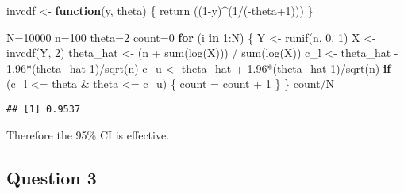 \documentclass[
]{article}
\newenvironment{Shaded}{\begin{snugshade}}{\end{snugshade}}
\newcommand{\ControlFlowTok}[1]{\textcolor[rgb]{0.13,0.29,0.53}{\textbf{#1}}}
\newcommand{\DecValTok}[1]{\textcolor[rgb]{0.00,0.00,0.81}{#1}}
\newcommand{\FloatTok}[1]{\textcolor[rgb]{0.00,0.00,0.81}{#1}}
\newcommand{\FunctionTok}[1]{\textcolor[rgb]{0.00,0.00,0.00}{#1}}
\newcommand{\NormalTok}[1]{#1}
\newcommand{\OtherTok}[1]{\textcolor[rgb]{0.56,0.35,0.01}{#1}}
\newcommand{\SpecialCharTok}[1]{\textcolor[rgb]{0.00,0.00,0.00}{#1}}
\begin{document}
\begin{Shaded}
\begin{Highlighting}[]
\NormalTok{invcdf }\OtherTok{\textless{}{-}} \ControlFlowTok{function}\NormalTok{(y, theta) \{}
  \FunctionTok{return}\NormalTok{ ((}\DecValTok{1}\SpecialCharTok{{-}}\NormalTok{y)}\SpecialCharTok{\^{}}\NormalTok{(}\DecValTok{1}\SpecialCharTok{/}\NormalTok{(}\SpecialCharTok{{-}}\NormalTok{theta}\SpecialCharTok{+}\DecValTok{1}\NormalTok{)))}
\NormalTok{\}}

\NormalTok{N}\OtherTok{=}\DecValTok{10000}
\NormalTok{n}\OtherTok{=}\DecValTok{100}
\NormalTok{theta}\OtherTok{=}\DecValTok{2}
\NormalTok{count}\OtherTok{=}\DecValTok{0}
\ControlFlowTok{for}\NormalTok{ (i }\ControlFlowTok{in} \DecValTok{1}\SpecialCharTok{:}\NormalTok{N) \{}
\NormalTok{  Y }\OtherTok{\textless{}{-}} \FunctionTok{runif}\NormalTok{(n, }\DecValTok{0}\NormalTok{, }\DecValTok{1}\NormalTok{)}
\NormalTok{  X }\OtherTok{\textless{}{-}} \FunctionTok{invcdf}\NormalTok{(Y, }\DecValTok{2}\NormalTok{)}
\NormalTok{  theta\_hat }\OtherTok{\textless{}{-}}\NormalTok{ (n }\SpecialCharTok{+} \FunctionTok{sum}\NormalTok{(}\FunctionTok{log}\NormalTok{(X))) }\SpecialCharTok{/} \FunctionTok{sum}\NormalTok{(}\FunctionTok{log}\NormalTok{(X))}
\NormalTok{  c\_l }\OtherTok{\textless{}{-}}\NormalTok{ theta\_hat }\SpecialCharTok{{-}} \FloatTok{1.96}\SpecialCharTok{*}\NormalTok{(theta\_hat}\DecValTok{{-}1}\NormalTok{)}\SpecialCharTok{/}\FunctionTok{sqrt}\NormalTok{(n)}
\NormalTok{  c\_u }\OtherTok{\textless{}{-}}\NormalTok{ theta\_hat }\SpecialCharTok{+} \FloatTok{1.96}\SpecialCharTok{*}\NormalTok{(theta\_hat}\DecValTok{{-}1}\NormalTok{)}\SpecialCharTok{/}\FunctionTok{sqrt}\NormalTok{(n)}
  \ControlFlowTok{if}\NormalTok{ (c\_l }\SpecialCharTok{\textless{}=}\NormalTok{ theta }\SpecialCharTok{\&}\NormalTok{ theta }\SpecialCharTok{\textless{}=}\NormalTok{ c\_u) \{}
\NormalTok{    count }\OtherTok{=}\NormalTok{ count }\SpecialCharTok{+} \DecValTok{1}
\NormalTok{  \}}
\NormalTok{\}}
\NormalTok{count}\SpecialCharTok{/}\NormalTok{N}
\end{Highlighting}
\end{Shaded}

\begin{verbatim}
## [1] 0.9537
\end{verbatim}

Therefore the 95\% CI is effective.

\hypertarget{question-3}{%
\subsection{Question 3}\label{question-3}}
\end{document}
